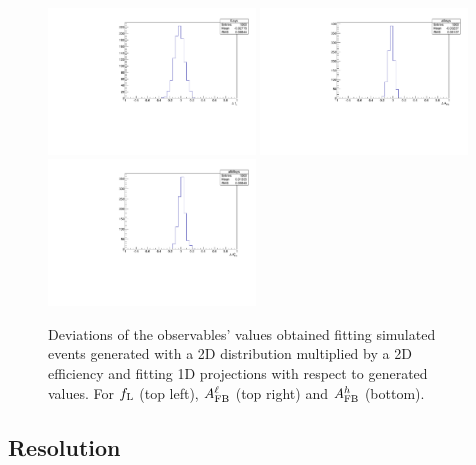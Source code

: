 \begin{figure}[h!]
\centering
\includegraphics[width=0.49\textwidth]{Lmumu/figs/fLsys_efficiency.pdf}
\includegraphics[width=0.49\textwidth]{Lmumu/figs/afbsys_efficiency.pdf}
\includegraphics[width=0.49\textwidth]{Lmumu/figs/afbBsys_efficiency.pdf}
\caption{Deviations of the observables' values obtained fitting simulated events
 generated with a 2D distribution multiplied by a 2D efficiency and fitting 1D projections
 with respect to generated values. For $f_{\rm L}$ (top left), 
 $A_{\rm FB}^\ell$ (top right) and $A_{\rm FB}^h$ (bottom). }
\label{fig:effBias}
\end{figure}




\subsection{Resolution}

